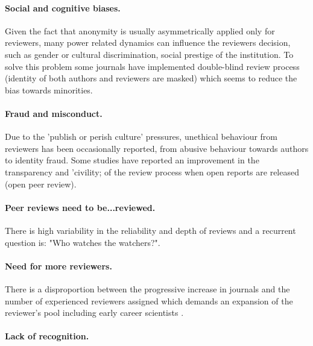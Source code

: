 \documentclass[runningheads]{llncs}
\begin{document}
\paragraph{Social and cognitive biases.} Given the fact that anonymity is usually asymmetrically applied only for reviewers, many power related dynamics can influence the reviewers decision, such as gender or cultural discrimination, social prestige of the institution. To solve this problem some journals have implemented double-blind review process (identity of both authors and reviewers are masked) which seems to reduce the bias towards minorities.
\paragraph{Fraud and misconduct.} Due to the 'publish or perish culture' pressures, unethical behaviour from reviewers has been occasionally reported, from abusive behaviour towards authors \cite{Smith2006,tragedy-reviewers} to identity fraud. Some studies have reported an improvement in the transparency and 'civility; of the review process when open reports are released (open peer review). 
\paragraph{Peer reviews need to be...reviewed.} There is high variability in the reliability and depth of reviews and a recurrent question is: "Who watches the watchers?". 
\paragraph{Need for more reviewers.} There is a disproportion between the progressive increase in journals and the number of experienced reviewers assigned which demands an expansion of the reviewer's pool including early career scientists \cite{tragedy-reviewers}.
\paragraph{Lack of recognition.}
\end{document}
